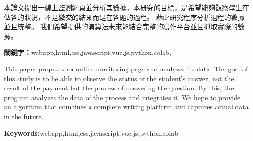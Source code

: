 \let\cleardoublepage\clearpage
\begin{abstractzh}
本論文提出一線上監測網頁並分析其數據。本研究的目標，是希望能夠觀察學生在做答的狀況，不是繳交的結果而是在答題的過程。
藉此研究程序分析過程的數據並且統整。
我們希望提供的演算法未來能結合完整的寫作平台並且抓取實際的數據。

\bigbreak
\noindent \textbf{關鍵字：}{webapp,html,css,javascript,vue.js,python,colab,  \@keywordszh \makeatother}
\end{abstractzh}

\begin{abstracten}
This paper proposes an online monitoring page and analyzes its data. The goal of this study is to be able to observe the status of the student's answer, not the result of the payment but the process of answering the question.
By this, the program analyzes the data of the process and integrates it.
We hope to provide an algorithm that combines a complete writing platform and captures actual data in the future.

\bigbreak
\noindent \textbf{Keywords:}{webapp,html,css,javascript,vue.js,python,colab\makeatletter \makeatother}
\end{abstracten}

\begin{comment}
\category{I2.10}{Computing Methodologies}{Artificial Intelligence --
Vision and Scene Understanding} \category{H5.3}{Information
Systems}{Information Interfaces and Presentation (HCI) -- Web-based
Interaction.}

\terms{Design, Human factors, Performance.}

\keywords{Region of interest, Visual attention model, Web-based
games, Benchmarks.}
\end{comment}
